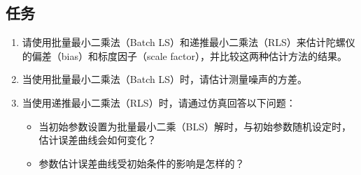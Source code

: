 \documentclass[openany,12pt,UTF8]{ctexart}
\begin{document}
\subsection{任务}
\begin{enumerate}
    \item 请使用批量最小二乘法（Batch LS）和递推最小二乘法（RLS）来估计陀螺仪的偏差（bias）和标度因子（scale factor），并比较这两种估计方法的结果。
    \item 当使用批量最小二乘法（Batch LS）时，请估计测量噪声的方差。
    \item 当使用递推最小二乘法（RLS）时，请通过仿真回答以下问题：
          \begin{itemize}
              \item 当初始参数设置为批量最小二乘（BLS）解时，与初始参数随机设定时，估计误差曲线会如何变化？
              \item 参数估计误差曲线受初始条件的影响是怎样的？
          \end{itemize}
\end{enumerate}
\end{document}
